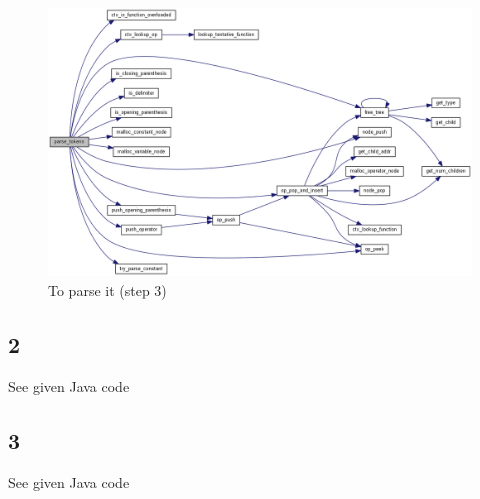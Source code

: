     \begin{figure}[H]
        \centering
        \includegraphics[width=\linewidth]{images/ex7/parse.png}
        \caption{To parse it (step 3)}
    \end{figure}

\subsection{2}
See given Java code

\subsection{3}
See given Java code